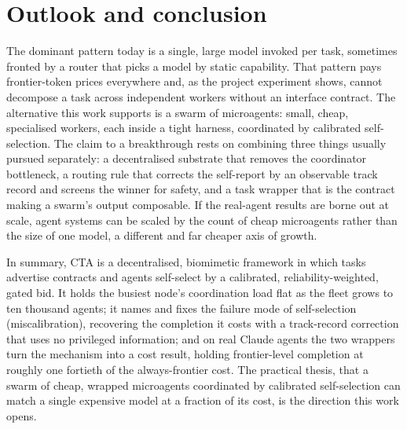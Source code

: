 \documentclass[11pt]{article}
\begin{document}
\section{Outlook and conclusion}

The dominant pattern today is a single, large model invoked per task, sometimes fronted by a router that picks a model by static capability. That pattern pays frontier-token prices everywhere and, as the project experiment shows, cannot decompose a task across independent workers without an interface contract. The alternative this work supports is a swarm of microagents: small, cheap, specialised workers, each inside a tight harness, coordinated by calibrated self-selection. The claim to a breakthrough rests on combining three things usually pursued separately: a decentralised substrate that removes the coordinator bottleneck, a routing rule that corrects the self-report by an observable track record and screens the winner for safety, and a task wrapper that is the contract making a swarm's output composable. If the real-agent results are borne out at scale, agent systems can be scaled by the count of cheap microagents rather than the size of one model, a different and far cheaper axis of growth.

In summary, CTA is a decentralised, biomimetic framework in which tasks advertise contracts and agents self-select by a calibrated, reliability-weighted, gated bid. It holds the busiest node's coordination load flat as the fleet grows to ten thousand agents; it names and fixes the failure mode of self-selection (miscalibration), recovering the completion it costs with a track-record correction that uses no privileged information; and on real Claude agents the two wrappers turn the mechanism into a cost result, holding frontier-level completion at roughly one fortieth of the always-frontier cost. The practical thesis, that a swarm of cheap, wrapped microagents coordinated by calibrated self-selection can match a single expensive model at a fraction of its cost, is the direction this work opens.



\end{document}
